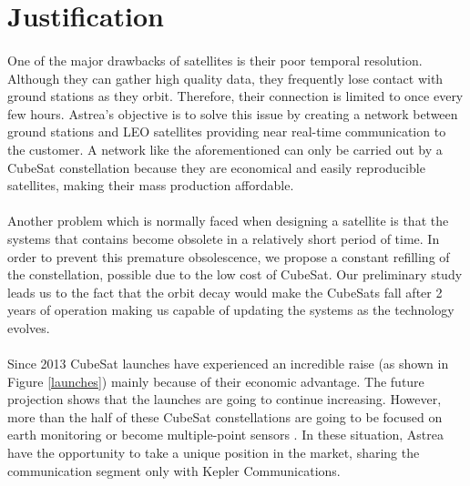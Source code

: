 \section{Justification}
\paragraph{}
One of the major drawbacks of satellites is their poor temporal resolution. Although they can gather high quality data, they frequently lose contact with ground stations as they orbit. Therefore, their connection is limited to once every few hours. Astrea’s objective is to solve this issue by creating a network between ground stations and LEO satellites providing near real-time communication to the customer. A network like the aforementioned can only be carried out by a CubeSat constellation because they are economical and easily reproducible satellites, making their mass production affordable.

\paragraph{}
Another problem which is normally faced when designing a satellite is that the systems that contains become obsolete in a relatively short period of time. In order to prevent this premature obsolescence, we propose a constant refilling of the constellation, possible due to the low cost of CubeSat. Our preliminary study leads us to the fact that the orbit decay would make the CubeSats fall after 2 years of operation making us capable of updating the systems as the technology evolves.

\paragraph{}
Since 2013 CubeSat launches have experienced an incredible raise (as shown in Figure \ref{launches}) mainly because of their economic advantage. The future projection shows that the launches are going to continue increasing. However, more than the half of these CubeSat constellations are going to be focused on earth monitoring or become multiple-point sensors \cite{SpaceWorks}. In these situation, Astrea have the opportunity to take a unique position in the market, sharing the communication segment only with Kepler Communications\cite{keppler}.

